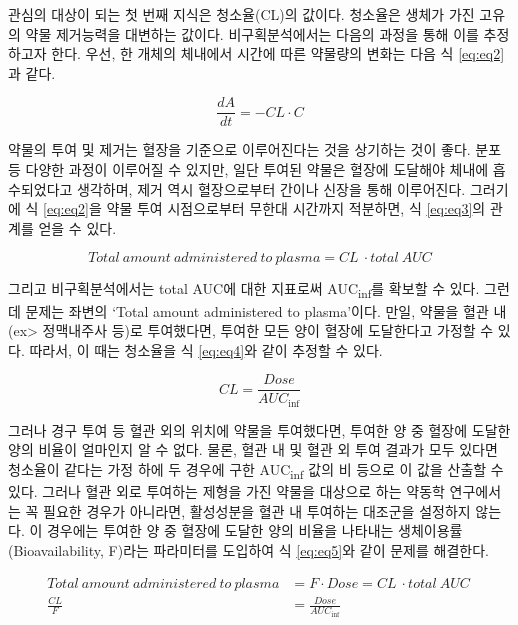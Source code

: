 \documentclass[
  11pt,
  krantz2, a4paper, twoside]{krantz}
\theoremstyle{definition}
\theoremstyle{definition}
\theoremstyle{definition}
\theoremstyle{definition}
\theoremstyle{remark}
\begin{document}
관심의 대상이 되는 첫 번째 지식은 청소율(CL)의 값이다.
청소율은 생체가 가진 고유의 약물 제거능력을 대변하는 값이다.
비구획분석에서는 다음의 과정을 통해 이를 추정하고자 한다.
우선, 한 개체의 체내에서 시간에 따른 약물량의 변화는 다음 식 \eqref{eq:eq2}과 같다.

\begin{equation}
\frac{dA}{dt} = -CL \cdot C
\label{eq:eq2}
\end{equation}

약물의 투여 및 제거는 혈장을 기준으로 이루어진다는 것을 상기하는 것이 좋다.
분포 등 다양한 과정이 이루어질 수 있지만, 일단 투여된 약물은 혈장에 도달해야 체내에 흡수되었다고 생각하며, 제거 역시 혈장으로부터 간이나 신장을 통해 이루어진다.
그러기에 식 \eqref{eq:eq2}을 약물 투여 시점으로부터 무한대 시간까지 적분하면, 식 \eqref{eq:eq3}의 관계를 얻을 수 있다.

\begin{equation}
Total\ amount\ administered\ to\ plasma = CL\  \cdot total\ AUC
\label{eq:eq3}
\end{equation}

그리고 비구획분석에서는 total AUC에 대한 지표로써 AUC\textsubscript{inf}를 확보할 수 있다.
그런데 문제는 좌변의 `Total amount administered to plasma'이다.
만일, 약물을 혈관 내(ex\textgreater{} 정맥내주사 등)로 투여했다면, 투여한 모든 양이 혈장에 도달한다고 가정할 수 있다.
따라서, 이 때는 청소율을 식 \eqref{eq:eq4}와 같이 추정할 수 있다.

\begin{equation}
CL = \frac{{Dose}}{{AUC}_{\inf}}
\label{eq:eq4}
\end{equation}

그러나 경구 투여 등 혈관 외의 위치에 약물을 투여했다면, 투여한 양 중 혈장에 도달한 양의 비율이 얼마인지 알 수 없다.
물론, 혈관 내 및 혈관 외 투여 결과가 모두 있다면 청소율이 같다는 가정 하에 두 경우에 구한 AUC\textsubscript{inf} 값의 비 등으로 이 값을 산출할 수 있다.
그러나 혈관 외로 투여하는 제형을 가진 약물을 대상으로 하는 약동학 연구에서는 꼭 필요한 경우가 아니라면, 활성성분을 혈관 내 투여하는 대조군을 설정하지 않는다.
이 경우에는 투여한 양 중 혈장에 도달한 양의 비율을 나타내는 생체이용률(Bioavailability, F)라는 파라미터를 도입하여 식 \eqref{eq:eq5}와 같이 문제를 해결한다.

\begin{equation}
\begin{split}
Total\ amount\ administered\ to\ plasma &= F \cdot Dose = CL\  \cdot total\ AUC\ \\
\frac{{CL}}{F} &= \frac{{Dose}}{{AUC}_{\inf}}
\end{split}
\label{eq:eq5}
\end{equation}
\end{document}
